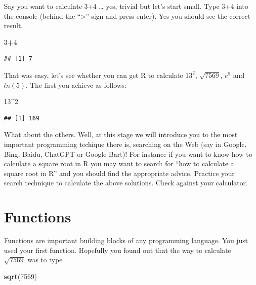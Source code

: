\documentclass[
]{article}
\newenvironment{Shaded}{\begin{snugshade}}{\end{snugshade}}
\newcommand{\DecValTok}[1]{\textcolor[rgb]{0.00,0.00,0.81}{#1}}
\newcommand{\FunctionTok}[1]{\textcolor[rgb]{0.13,0.29,0.53}{\textbf{#1}}}
\newcommand{\NormalTok}[1]{#1}
\newcommand{\SpecialCharTok}[1]{\textcolor[rgb]{0.81,0.36,0.00}{\textbf{#1}}}
\begin{document}
Say you want to calculate 3+4 \ldots{} yes, trivial but let's start
small. Type 3+4 into the console (behind the ``\textgreater{}'' sign and
press enter). Yes you should see the correct result.

\begin{Shaded}
\begin{Highlighting}[]
\DecValTok{3}\SpecialCharTok{+}\DecValTok{4}
\end{Highlighting}
\end{Shaded}

\begin{verbatim}
## [1] 7
\end{verbatim}

That was easy, let's see whether you can get R to calculate \(13^2\),
\(\sqrt{7569}\), \(e^{5}\) and \(ln(5)\). The first you achieve as
follows:

\begin{Shaded}
\begin{Highlighting}[]
\DecValTok{13}\SpecialCharTok{\^{}}\DecValTok{2}
\end{Highlighting}
\end{Shaded}

\begin{verbatim}
## [1] 169
\end{verbatim}

What about the others. Well, at this stage we will introduce you to the
most important programming techique there is, searching on the Web (say
in Google, Bing, Baidu, ChatGPT or Google Bart)! For instance if you
want to know how to calculate a square root in R you may want to search
for ``how to calculate a square root in R'' and you should find the
appropriate advice. Practice your search technique to calculate the
above solutions. Check against your calculator.

\hypertarget{functions}{%
\section{Functions}\label{functions}}

Functions are important building blocks of any programming language. You
just used your first function. Hopefully you found out that the way to
calculate \(\sqrt{7569}\) was to type

\begin{Shaded}
\begin{Highlighting}[]
\FunctionTok{sqrt}\NormalTok{(}\DecValTok{7569}\NormalTok{)}
\end{Highlighting}
\end{Shaded}
\end{document}
